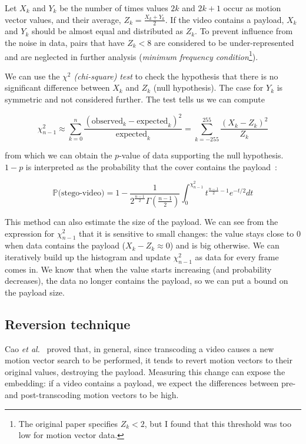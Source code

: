 \documentclass[12pt,british,twoside,notitlepage,usenames,dvipsnames,hypens,final]{report}
\numberwithin{equation}{section}
\numberwithin{figure}{section}
\begin{document}
Let $X_k$ and $Y_k$ be the number of times values $2k$ and $2k+1$ occur as motion vector values, and their average, $Z_k = \frac{X_k + Y_k}{2}$. If the video contains a payload, $X_k$ and $Y_k$ should be almost equal and distributed as $Z_k$. To prevent influence from the noise in data, pairs that have $Z_k < 8$ are considered to be under-represented and are neglected in further analysis (\emph{minimum frequency condition}\footnote{The original paper specifies $Z_k < 2$, but I found that this threshold was too low for motion vector data.}).

We can use the \emph{$\chi^2$ (chi-square) test} to check the hypothesis that there is no significant difference between $X_k$ and $Z_k$ (null hypothesis). The case for $Y_k$ is symmetric and not considered further. The test tells us we can compute

$$ \chi^2_{n-1} \approx \sum^{n}_{k=0} \frac{(\text{observed}_k - \text{expected}_k)^2}{\text{expected}_k}= \sum^{255}_{k=-255} \frac{(X_k - Z_k)^2}{Z_k} $$ 

from which we can obtain the $p$-value of data supporting the null hypothesis. $1 - p$ is interpreted as the probability that the cover contains the payload~\cite{westfeld1999attacks}:

$$ \mathbb{P}\text{(stego-video)} = 1 - \frac{1}{2^{\frac{n-1}{2}}\Gamma(\frac{n-1}{2})}\int_0^{\chi^2_{n-1}}t^{\frac{n-1}{2}−1}e^{-t/2}dt $$  

This method can also estimate the size of the payload. We can see from the expression for $\chi^2_{n-1}$ that it is sensitive to small changes: the value stays close to 0 when data contains the payload ($X_k - Z_k \approx 0$) and is big otherwise. We can iteratively build up the histogram and update $\chi^2_{n-1}$ as data for every frame comes in. We know that when the value starts increasing (and probability decreases), the data no longer contains the payload, so we can put a bound on the payload size. 

\subsection{Reversion technique}
\label{rev-tech-theory}
Cao \emph{et al.}~\cite{cao2012video} proved that, in general, since transcoding a video causes a new motion vector search to be performed, it tends to revert motion vectors to their original values, destroying the payload. Measuring this change can expose the embedding: if a video contains a payload, we expect the differences between pre- and post-transcoding motion vectors to be high.
\end{document}
